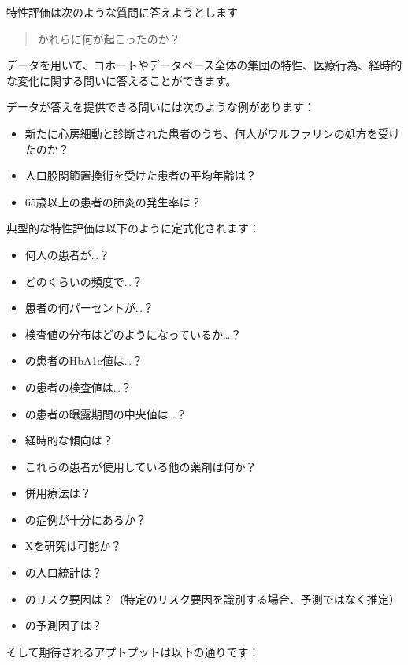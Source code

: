 \documentclass[
  11pt]{book}
\providecommand{\tightlist}{%
  \setlength{\itemsep}{0pt}\setlength{\parskip}{0pt}}
\theoremstyle{definition}
\theoremstyle{definition}
\theoremstyle{definition}
\theoremstyle{definition}
\theoremstyle{remark}
\begin{document}

特性評価は次のような質問に答えようとします

\begin{quote}
かれらに何が起こったのか？
\end{quote}

データを用いて、コホートやデータベース全体の集団の特性、医療行為、経時的な変化に関する問いに答えることができます。

データが答えを提供できる問いには次のような例があります：

\begin{itemize}
\tightlist
\item
  新たに心房細動と診断された患者のうち、何人がワルファリンの処方を受けたのか？
\item
  人口股関節置換術を受けた患者の平均年齢は？
\item
  65歳以上の患者の肺炎の発生率は？
\end{itemize}

典型的な特性評価は以下のように定式化されます：

\begin{itemize}
\tightlist
\item
  何人の患者が\ldots？
\item
  どのくらいの頻度で\ldots？
\item
  患者の何パーセントが\ldots？
\item
  検査値の分布はどのようになっているか\ldots？
\item
  の患者のHbA1c値は\ldots？
\item
  の患者の検査値は\ldots？
\item
  の患者の曝露期間の中央値は\ldots？
\item
  経時的な傾向は？
\item
  これらの患者が使用している他の薬剤は何か？
\item
  併用療法は？
\item
  の症例が十分にあるか？
\item
  Xを研究は可能か？
\item
  の人口統計は？
\item
  のリスク要因は？（特定のリスク要因を識別する場合、予測ではなく推定）
\item
  の予測因子は？
\end{itemize}

そして期待されるアプトプットは以下の通りです：
\end{document}
